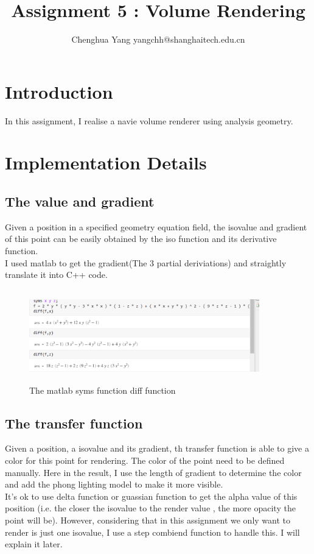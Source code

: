 \documentclass[acmtog]{acmart}
\title{Assignment 5 : Volume Rendering}
\author{Chenghua Yang \quad 2019533089 \quad yangchh@shanghaitech.edu.cn}
\begin{document}
\maketitle

\vspace*{2 ex}


\section{Introduction}

In this assignment, I realise a navie volume renderer using analysis geometry.

\section{Implementation Details}

\subsection{The value and gradient}
Given a position in a specified geometry equation field, the isovalue and gradient of this point can be easily obtained by the iso function and its derivative function.\\ 
I used matlab to get the gradient(The 3 partial deriviations) and straightly translate it into C++ code.\\
\begin{figure}[h]
        \centering
        \includegraphics[width=10cm,height=4cm]{matlab.png}
        \caption{The matlab syms function diff function}
\end{figure}

\subsection{The transfer function}
Given a position, a isovalue and its gradient, th transfer function is able to give a color for this point for rendering.
The color of the point need to be defined manually. Here in the result, I use the length of gradient to determine the color and add the phong lighting model to make it more visible.\\
It's ok to use delta function or guassian function to get the alpha value of this position (i.e. the closer the isovalue to the render value , the more opacity the point will be). However, considering that in this assignment we only want to render is just one isovalue, I use a step combiend function to handle this. I will explain it later.\\
\end{document}
